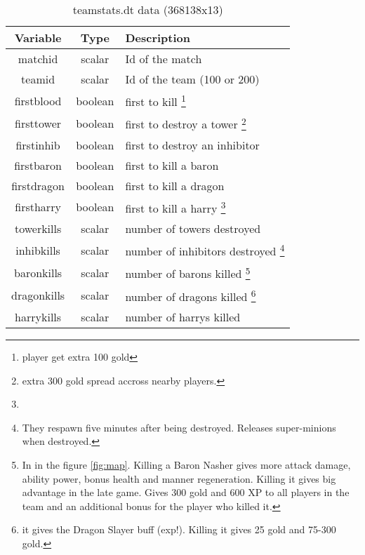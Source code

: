 \begin{longtable}{|c|c|l|}
        \caption{teamstats.dt data (368138x13)}
        \label{tab:teamstats.dt} \\
        
        \hline
        Variable & Type & Description\\
        \hline
        \endfirsthead
        
        \hline
        matchid           & scalar          & Id of the match \\    
        teamid            & scalar          & Id of the team (100 or 200) \\      
        firstblood        & boolean         & first to kill \footnote{player get extra 100 gold}\\
        firsttower        & boolean         & first to destroy a tower \footnote{extra 300 gold spread accross nearby players.} \\
        firstinhib        & boolean         & first to destroy an inhibitor\\
        firstbaron        & boolean         & first to kill a baron \\
        firstdragon       & boolean         & first to kill a dragon \\
        firstharry        & boolean         & first to kill a harry \footnote{}\\
        towerkills        & scalar          & number of towers destroyed \\
        inhibkills        & scalar          & number of inhibitors destroyed \footnote{They respawn five minutes after being destroyed. Releases super-minions when destroyed.} \\
        baronkills        & scalar          & number of barons killed \footnote{In in the figure \ref{fig:map}. Killing a Baron Nasher gives more attack damage, ability power, bonus health and manner regeneration. Killing it gives big advantage in the late game. Gives 300 gold and 600 XP to all players in the team and an additional bonus for the player who killed it.}\\
        dragonkills       & scalar          & number of dragons killed \footnote{it gives the Dragon Slayer buff (exp!). Killing it gives 25 gold and 75-300 gold.} \\
        harrykills        & scalar          & number of harrys killed \\ 
        \hline
\end{longtable}